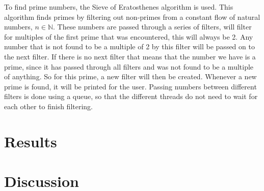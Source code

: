 \documentclass[a4paper,12px]{article}
\begin{document}
To find prime numbers, the Sieve of Eratosthenes algorithm is used. This
algorithm finds primes by filtering out non-primes from a constant flow of
natural numbers, $n \in \mathbb{N}$. These numbers are passed through a series
of filters, will filter for multiples of the first prime that was encountered,
this will always be 2. Any number that is not found to be a multiple of 2 by
this filter will be passed on to the next filter. If there is no next filter
that means that the number we have is a prime, since it has passed through all
filters and was not found to be a multiple of anything. So for this prime, a new
filter will then be created. Whenever a new prime is found, it will be printed
for the user. Passing numbers between different filters is done using a queue,
so that the different threads do not need to wait for each other to finish
filtering.



\section{Results}


\section{Discussion}


%
%
\end{document}
